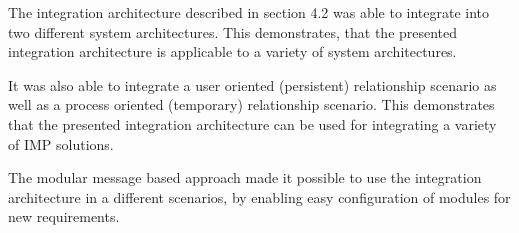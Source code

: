 The integration architecture described in section 4.2 was able to integrate into two different system architectures. This demonstrates, that the presented integration architecture is applicable to a variety of system architectures.

It was also able to integrate a user oriented (persistent) relationship scenario as well as a process oriented (temporary) relationship scenario. This demonstrates that the presented integration architecture can be used for integrating a variety of IMP solutions.

The modular message based approach made it possible to use the integration architecture in a different scenarios, by enabling easy configuration of modules for new requirements.
